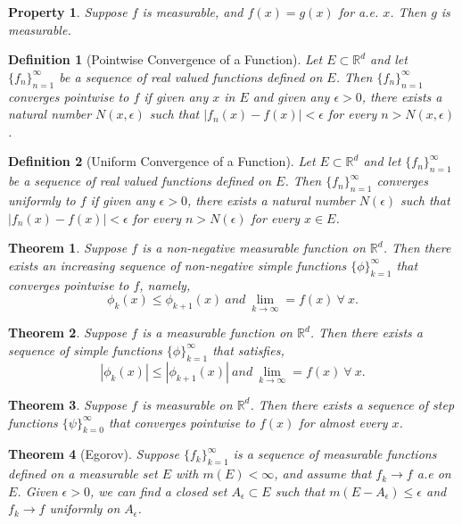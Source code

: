 \documentclass{report}
\newtheorem{thm}{Theorem}
\newtheorem{defn}{Definition}
\newtheorem{property}{Property}
\newcommand{\reals}{\mathbb{R}}
\newcommand{\set}[1]{\big\lbrace #1 \big\rbrace}
\begin{document}
\begin{property}
	Suppose $f$ is measurable, and $f(x) = g(x)$ for a.e. $x$. Then $g$ is measurable.
\end{property}

\begin{defn}[Pointwise Convergence of a Function]
	Let $E \subset \reals^d$ and let $\set{f_n}_{n=1}^{\infty}$ be a sequence of real valued functions defined on $E$. Then $\set{f_n}_{n=1}^\infty$ converges pointwise to $f$ if given any $x$ in $E$ and	given any $\epsilon > 0$, there exists a natural number $N(x, \epsilon)$ such that $|f_n(x) - f(x)| < \epsilon$ for every $n > N(x, \epsilon)$.
\end{defn}

\begin{defn}[Uniform Convergence of a Function]
	Let $E \subset \reals^d$ and let $\set{f_n}_{n=1}^{\infty}$ be a sequence of real valued functions defined on $E$. Then $\set{f_n}_{n=1}^\infty$ converges uniformly to $f$ if given any $\epsilon > 0$, there exists a natural number $N(\epsilon)$ such that $|f_n(x) - f(x)| < \epsilon$ for every $n > N(\epsilon)$ for every $x \in E$.
\end{defn}

\begin{thm}
	Suppose $f$ is a non-negative measurable function on $\reals^d$. Then there exists an increasing sequence of non-negative simple functions $\set{\phi}_{k=1}^{\infty} $ that converges pointwise to $f$, namely,
	$$ \phi_k (x) \leq \phi_{k+1} (x)\ and\ \lim_{k \rightarrow \infty} = f(x)\ \forall\ x.$$
\end{thm}

\begin{thm}
	Suppose $f$ is a measurable function on $\reals^d$. Then there exists a sequence of simple functions $\set{\phi}_{k=1}^{\infty} $ that satisfies,
	$$ |\phi_k (x)| \leq |\phi_{k+1} (x)| \ and\ \lim_{k \rightarrow \infty} = f(x)\ \forall\ x.$$
\end{thm}

\begin{thm}
	Suppose $f$ is measurable on $\reals^d$. Then there exists a sequence of step functions $\set{\psi}_{k=0}^\infty$ that converges pointwise to $f(x)$ for almost every $x$.
\end{thm}

\begin{thm}[Egorov]
	Suppose $\set{f_k}_{k=1}^\infty$ is a sequence of measurable functions defined on a measurable set $E$ with $m(E) < \infty $, and assume that $f_k \rightarrow f$ a.e on $E$. Given $\epsilon > 0 $, we can find a closed set $A_\epsilon \subset E$ such that $m(E - A_\epsilon) \leq \epsilon$ and $f_k \rightarrow f$ uniformly on $A_\epsilon$.
\end{thm}
\end{document}
